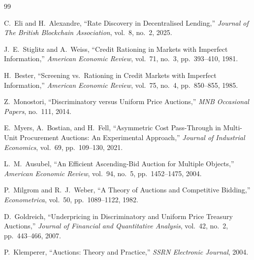 \documentclass[a4paper,11pt]{article}
\begin{document}
\begin{thebibliography}{99}
\small

C.\ Eli and H.\ Alexandre,
``Rate Discovery in Decentralised Lending,''
\textit{Journal of The British Blockchain Association},
vol.~8, no.~2, 2025.

J.\ E.\ Stiglitz and A.\ Weiss,
``Credit Rationing in Markets with Imperfect Information,''
\textit{American Economic Review},
vol.~71, no.~3, pp.~393--410, 1981.

H.\ Bester,
``Screening vs.\ Rationing in Credit Markets with Imperfect Information,''
\textit{American Economic Review},
vol.~75, no.~4, pp.~850--855, 1985.

Z.\ Monostori,
``Discriminatory versus Uniform Price Auctions,''
\textit{MNB Occasional Papers},
no.~111, 2014.

E.\ Myers, A.\ Bostian, and H.\ Fell,
``Asymmetric Cost Pass-Through in Multi-Unit Procurement Auctions:
An Experimental Approach,''
\textit{Journal of Industrial Economics},
vol.~69, pp.~109--130, 2021.

L.\ M.\ Ausubel,
``An Efficient Ascending-Bid Auction for Multiple Objects,''
\textit{American Economic Review},
vol.~94, no.~5, pp.~1452--1475, 2004.

P.\ Milgrom and R.\ J.\ Weber,
``A Theory of Auctions and Competitive Bidding,''
\textit{Econometrica},
vol.~50, pp.~1089--1122, 1982.

D.\ Goldreich,
``Underpricing in Discriminatory and Uniform Price Treasury Auctions,''
\textit{Journal of Financial and Quantitative Analysis},
vol.~42, no.~2, pp.~443--466, 2007.

P.\ Klemperer,
``Auctions: Theory and Practice,''
\textit{SSRN Electronic Journal}, 2004.

\end{thebibliography}
\end{document}
